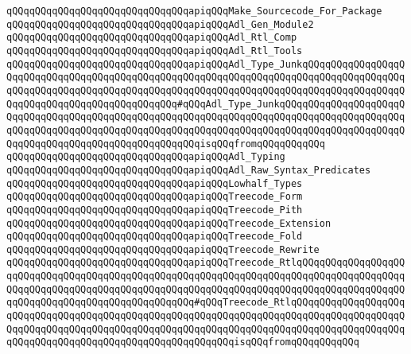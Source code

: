 \verb|qQQqqQQqqQQqqQQqqQQqqQQqqQQqqQQqapiqQQqMake_Sourcecode_For_Package|\newline
\verb|qQQqqQQqqQQqqQQqqQQqqQQqqQQqqQQqapiqQQqAdl_Gen_Module2|\newline
\verb|qQQqqQQqqQQqqQQqqQQqqQQqqQQqqQQqapiqQQqAdl_Rtl_Comp|\newline
\verb|qQQqqQQqqQQqqQQqqQQqqQQqqQQqqQQqapiqQQqAdl_Rtl_Tools|\newline
\verb|qQQqqQQqqQQqqQQqqQQqqQQqqQQqqQQqapiqQQqAdl_Type_JunkqQQqqQQqqQQqqQQqqQQqqQQqqQQqqQQqqQQqqQQqqQQqqQQqqQQqqQQqqQQqqQQqqQQqqQQqqQQqqQQqqQQqqQQqqQQqqQQqqQQqqQQqqQQqqQQqqQQqqQQqqQQqqQQqqQQqqQQqqQQqqQQqqQQqqQQqqQQqqQQqqQQqqQQqqQQqqQQqqQQqqQQqqQQq#qQQqAdl_Type_JunkqQQqqQQqqQQqqQQqqQQqqQQqqQQqqQQqqQQqqQQqqQQqqQQqqQQqqQQqqQQqqQQqqQQqqQQqqQQqqQQqqQQqqQQqqQQqqQQqqQQqqQQqqQQqqQQqqQQqqQQqqQQqqQQqqQQqqQQqqQQqqQQqqQQqqQQqqQQqqQQqqQQqqQQqqQQqqQQqqQQqqQQqqQQqqQQqqQQqisqQQqfromqQQqqQQqqQQq|\newline
\verb|qQQqqQQqqQQqqQQqqQQqqQQqqQQqqQQqapiqQQqAdl_Typing|\newline
\verb|qQQqqQQqqQQqqQQqqQQqqQQqqQQqqQQqapiqQQqAdl_Raw_Syntax_Predicates|\newline
\verb|qQQqqQQqqQQqqQQqqQQqqQQqqQQqqQQqapiqQQqLowhalf_Types|\newline
\verb|qQQqqQQqqQQqqQQqqQQqqQQqqQQqqQQqapiqQQqTreecode_Form|\newline
\verb|qQQqqQQqqQQqqQQqqQQqqQQqqQQqqQQqapiqQQqTreecode_Pith|\newline
\verb|qQQqqQQqqQQqqQQqqQQqqQQqqQQqqQQqapiqQQqTreecode_Extension|\newline
\verb|qQQqqQQqqQQqqQQqqQQqqQQqqQQqqQQqapiqQQqTreecode_Fold|\newline
\verb|qQQqqQQqqQQqqQQqqQQqqQQqqQQqqQQqapiqQQqTreecode_Rewrite|\newline
\verb|qQQqqQQqqQQqqQQqqQQqqQQqqQQqqQQqapiqQQqTreecode_RtlqQQqqQQqqQQqqQQqqQQqqQQqqQQqqQQqqQQqqQQqqQQqqQQqqQQqqQQqqQQqqQQqqQQqqQQqqQQqqQQqqQQqqQQqqQQqqQQqqQQqqQQqqQQqqQQqqQQqqQQqqQQqqQQqqQQqqQQqqQQqqQQqqQQqqQQqqQQqqQQqqQQqqQQqqQQqqQQqqQQqqQQqqQQqqQQq#qQQqTreecode_RtlqQQqqQQqqQQqqQQqqQQqqQQqqQQqqQQqqQQqqQQqqQQqqQQqqQQqqQQqqQQqqQQqqQQqqQQqqQQqqQQqqQQqqQQqqQQqqQQqqQQqqQQqqQQqqQQqqQQqqQQqqQQqqQQqqQQqqQQqqQQqqQQqqQQqqQQqqQQqqQQqqQQqqQQqqQQqqQQqqQQqqQQqqQQqqQQqqQQqqQQqisqQQqfromqQQqqQQqqQQq|\newline
